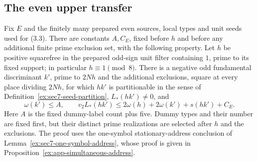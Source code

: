 \subsection{The even upper transfer}
\begin{proposition}\label{ex:app-rough-companion}
Fix $E$ and the finitely many prepared even sources, local types and
unit seeds used for (3.3). There are constants $A,C_E$, fixed before
$h$ and before any additional finite prime exclusion set, with the
following property. Let $h$ be positive squarefree in the prepared
odd-sign unit filter containing $1$, prime to its fixed support; in
particular $h\equiv1\pmod8$. There is a negative odd fundamental
discriminant $k'$, prime to $2Nh$ and the additional exclusions,
square at every place dividing $2Nh$, for which $hk'$ is partitionable
in the sense of Definition~\ref{ex:sec7-seed-partition},
$L_*(hk')\ne0$, and
\[
 \omega(k')\le A,\qquad
 v_2L_*(hk')\le2\omega(h)+2\omega(k')+s(hk')+C_E.
\]
Here $A$ is the fixed dummy-label count plus five. Dummy types and
their number are fixed first, but their distinct prime realizations
are selected after $h$ and the exclusions. The proof uses the
one-symbol stationary-address conclusion of
Lemma~\ref{ex:sec7-one-symbol-address}, whose proof is given in
Proposition~\ref{ex:app-simultaneous-address}.
\end{proposition}
